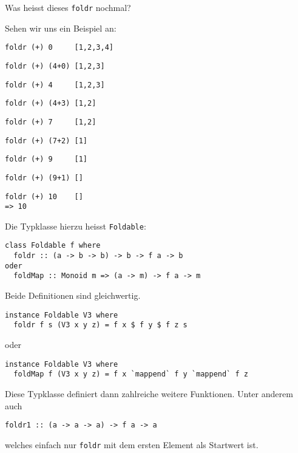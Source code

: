 \documentclass{beamer}
\begin{document}
\begin{frame}[fragile]
Was heisst dieses \texttt{foldr} nochmal?\\\par
\pause
Sehen wir uns ein Beispiel an:
\begin{overprint}
\begin{verbatim}
foldr (+) 0     [1,2,3,4]
\end{verbatim}
\begin{verbatim}
foldr (+) (4+0) [1,2,3]
\end{verbatim}
\begin{verbatim}
foldr (+) 4     [1,2,3]
\end{verbatim}
\begin{verbatim}
foldr (+) (4+3) [1,2]
\end{verbatim}
\begin{verbatim}
foldr (+) 7     [1,2]
\end{verbatim}
\begin{verbatim}
foldr (+) (7+2) [1]
\end{verbatim}
\begin{verbatim}
foldr (+) 9     [1]
\end{verbatim}
\begin{verbatim}
foldr (+) (9+1) []
\end{verbatim}
\begin{verbatim}
foldr (+) 10    []
=> 10
\end{verbatim}
\end{overprint}

\end{frame}


\begin{frame}[fragile]
Die Typklasse hierzu heisst \texttt{Foldable}:
\begin{verbatim}
class Foldable f where
  foldr :: (a -> b -> b) -> b -> f a -> b
oder
  foldMap :: Monoid m => (a -> m) -> f a -> m
\end{verbatim}
\pause
\smallskip

Beide Definitionen sind gleichwertig.\smallskip

\pause
\begin{verbatim}
instance Foldable V3 where
  foldr f s (V3 x y z) = f x $ f y $ f z s
\end{verbatim}
\pause
oder
\begin{verbatim}
instance Foldable V3 where
  foldMap f (V3 x y z) = f x `mappend` f y `mappend` f z
\end{verbatim}
\pause
Diese Typklasse definiert dann zahlreiche weitere Funktionen. Unter anderem auch
\begin{verbatim}
foldr1 :: (a -> a -> a) -> f a -> a
\end{verbatim}
welches einfach nur \texttt{foldr} mit dem ersten Element als Startwert ist.
\end{frame}
\end{document}
